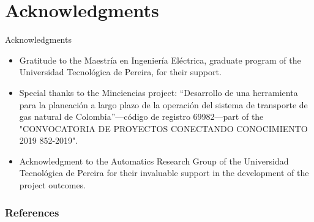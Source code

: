 \documentclass[10pt, xcolor=table]{beamer}
\let\olditem\item
\renewcommand\item{\olditem\justifying}
\begin{document}
\section*{Acknowledgments}
\begin{frame}{Acknowledgments}
	\begin{itemize}
		\item Gratitude to the Maestría en Ingeniería Eléctrica, graduate program of the Universidad Tecnológica de Pereira, for their support.
		
		\item Special thanks to the Minciencias project: “Desarrollo de una herramienta para la planeación a largo plazo de la operación del sistema de transporte de gas natural de Colombia”—código de registro 69982—part of the "CONVOCATORIA DE PROYECTOS CONECTANDO CONOCIMIENTO 2019 852-2019".
		
		\item Acknowledgment to the Automatics Research Group of the Universidad Tecnológica de Pereira for their invaluable support in the development of the project outcomes.
	\end{itemize}
\end{frame}



\tiny
\begin{frame}
	\raggedleft
	\frametitle{References}
	
	
\end{frame}
\end{document}
